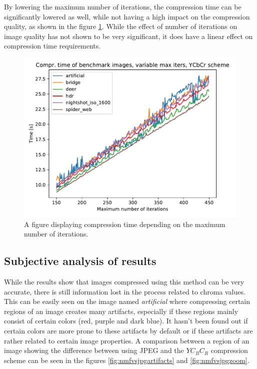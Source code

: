 \documentclass[thesis=M,english]{FITthesis}[2012/10/20]
\begin{document}
By lowering the maximum number of iterations, the compression time can be significantly lowered as well,
while not having a high impact on the compression quality, as shown in the figure \ref{fig:maxiter_ycbcr_comprtime}.
While the effect of number of iterations on image quality has not shown to be very significant,
it does have a linear effect on compression time requirements.

\begin{figure}
  \centering
  \includegraphics[scale=0.8]{imgs/results/maxiter_ycbcr_comprtime}
  \caption{A figure displaying compression time depending on the maximum number of iterations.}
  \label{fig:maxiter_ycbcr_comprtime}
\end{figure}

\subsection{Subjective analysis of results}
While the results show that images compressed using this method can be very
accurate, there is still information lost in the process related to chroma values.
This can be easily seen on the image named \emph{artificial} where compressing
certain regions of an image creates many artifacts, especially if these regions
mainly consist of certain colors (red, purple and dark blue). It hasn't been found out if
certain colors are more prone to these artifacts by default or if these
artifacts are rather related to certain image properties. A comparison between a region
of an image showing the difference between using JPEG and the $YC_BC_R$ compression
scheme can be seen in the figures \ref{fig:nmfvsjpgartifacts} and \ref{fig:nmfvsjpgzoom}.
\\
\end{document}
